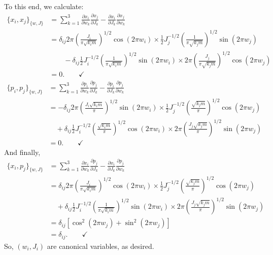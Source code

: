 \documentclass{article}
\theoremstyle{definition}
\newcommand{\p}{\partial}
\newcommand{\f}[2]{\frac{#1}{#2}}
\newcommand{\lp}{\left(}
\newcommand{\rp}{\right)}
\newcommand{\lb}{\left[}
\newcommand{\rb}{\right]}
\begin{document}
\begin{enumerate}[label=(\alph*)]
	To this end, we calculate:
	\begin{align*}
	\{x_i ,x_j \}_{\{w,J\}} 
	&= \sum_{k=1}^3  \f{\p x_i}{\p w_k}\f{\p x_j}{\p J_k} - 
	\f{\p x_i}{\p J_k}\f{\p x_j}{\p w_k} \\
	&= \delta_{ij}2\pi \lp \f{J_i}{\pi \sqrt{k_im }}\rp^{1/2}\cos(2\pi w_i) 
	\times \f{1}{2}J_j^{-1/2}\lp \f{1}{\pi \sqrt{k_jm }}\rp^{1/2}\sin(2\pi w_j) \\
	&\quad\quad - \delta_{ij}
	\f{1}{2}J_i^{-1/2}\lp \f{1}{\pi \sqrt{k_i m }}\rp^{1/2}\sin(2\pi w_i) 
	\times 2\pi \lp \f{J_j}{\pi \sqrt{k_j m }}\rp^{1/2}\cos(2\pi w_j) \\
	&= 0. \quad\quad \checkmark 	
	\end{align*}
	\begin{align*}
	\{p_i ,p_j \}_{\{w,J\}}
	&=  \sum_{k=1}^3  \f{\p p_i}{\p w_k}\f{\p p_j}{\p J_k} - \f{\p p_i}{\p J_k}\f{\p p_j}{\p w_k} \\
	&= -\delta_{ij}2\pi \lp \f{J_i\sqrt{k_im}}{\pi} \rp^{1/2} \sin (2\pi w_i) 
	\times \f{1}{2}J_j^{-1/2}\lp \f{\sqrt{k_jm}}{\pi} \rp^{1/2} \cos (2\pi w_j) \\
	&\quad +\delta_{ij}\f{1}{2}J_i^{-1/2}\lp \f{\sqrt{k_im}}{\pi} \rp^{1/2} \cos (2\pi w_i) 
	\times 2\pi \lp \f{J_j\sqrt{k_j m}}{\pi} \rp^{1/2} \sin (2\pi w_j)\\
	&= 0. \quad\quad\checkmark
	\end{align*}
	And finally, 
	\begin{align*}
	\{x_i ,p_j \}_{\{w,J\}} 
	&= \sum_{k=1}^3 \f{\p x_i}{\p w_k}\f{\p p_j}{\p J_k} - \f{\p x_i}{\p J_k}\f{\p p_j}{\p w_k} \\
	&= \delta_{ij}2\pi \lp \f{J_i}{\pi \sqrt{k_im }}\rp^{1/2}\cos(2\pi w_i) 
	\times \f{1}{2}J_j^{-1/2}\lp \f{\sqrt{k_jm}}{\pi} \rp^{1/2} \cos (2\pi w_j)\\
	&\quad + \delta_{ij}
	\f{1}{2}J_i^{-1/2}\lp \f{1}{\pi \sqrt{k_i m }}\rp^{1/2}\sin(2\pi w_i) 
	\times 2\pi \lp \f{J_j\sqrt{k_j m}}{\pi} \rp^{1/2} \sin (2\pi w_j)\\
	&= \delta_{ij}\lb \cos^2(2\pi w_j) + \sin^2(2\pi w_j) \rb \\
	&= \delta_{ij}. \quad\quad \checkmark
	\end{align*}
	So, $(w_i, J_i)$ are canonical variables, as desired. 
	

\end{enumerate}
\end{document}
